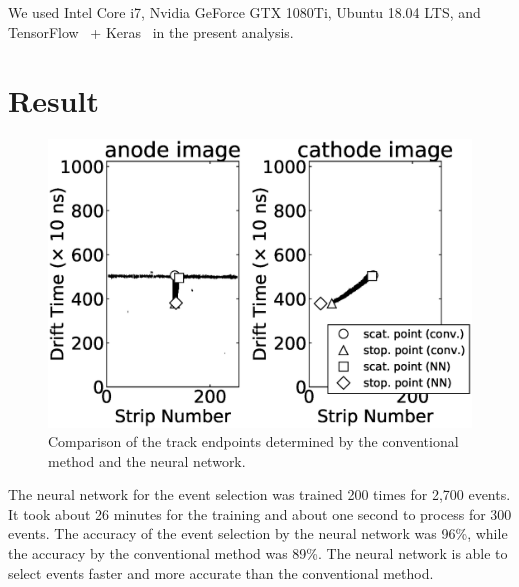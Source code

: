 \documentclass{jps-cp}
\begin{document}
We used Intel Core i7, Nvidia GeForce GTX 1080Ti, Ubuntu 18.04 LTS, and
TensorFlow~\cite{tensorflow} + Keras~\cite{keras} in the present analysis.

\section{Result}
\begin{figure}
  \vspace{-6zw}
  \centering
  \includegraphics[clip, width=25zw]{eps/compare_mono_v2.eps}
  \caption{Comparison of the track endpoints determined by the conventional method and the neural network.}
  \label{fig:result_detection}
  \vspace{-2zw}
\end{figure}

The neural network for the event selection was trained 200 times for 2,700 events.
It took about 26 minutes for the training and about one second to process for 300 events.
The accuracy of the event selection by the neural network was 96\%,
while the accuracy by the conventional method was 89\%.
The neural network is able to select events faster and more accurate than the conventional method.

\end{document}
